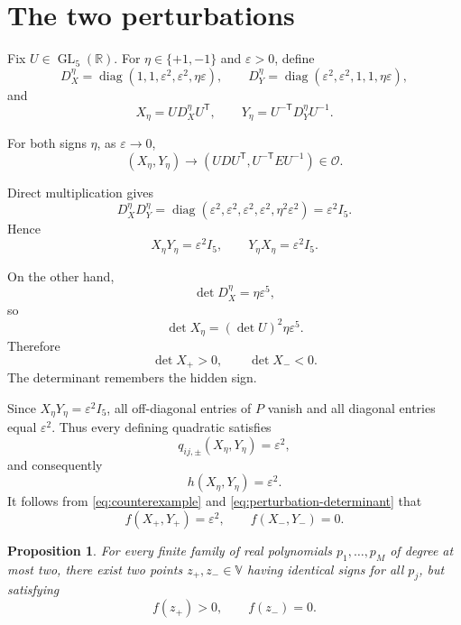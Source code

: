 \documentclass[11pt]{amsart}
\newtheorem{proposition}[theorem]{Proposition}
\theoremstyle{remark}
\DeclareMathOperator{\GL}{GL}
\DeclareMathOperator{\diag}{diag}
\newcommand{\tp}{{\scriptscriptstyle\mathsf{T}}}
\begin{document}
\section{The two perturbations}

Fix $U\in\GL_5(\mathbb R)$. For $\eta\in\{+1,-1\}$ and $\varepsilon>0$, define
\[
D_X^\eta=\diag(1,1,\varepsilon^2,\varepsilon^2,\eta\varepsilon),
\qquad
D_Y^\eta=\diag(\varepsilon^2,\varepsilon^2,1,1,\eta\varepsilon),
\]
and
\begin{equation}
X_\eta=UD_X^\eta U^\tp ,
\qquad
Y_\eta=U^{-\tp} D_Y^\eta U^{-1}.
\label{eq:perturbations}
\end{equation}

For both signs $\eta$, as $\varepsilon \to 0$, 
\[
(X_\eta,Y_\eta)\longrightarrow
(UDU^\tp ,U^{-\tp} EU^{-1})\in\mathcal O.
\]

Direct multiplication gives
\[
D_X^\eta D_Y^\eta
=\diag(\varepsilon^2,\varepsilon^2,\varepsilon^2,\varepsilon^2,\eta^2\varepsilon^2)
=\varepsilon^2I_5.
\]
Hence
\begin{equation}
X_\eta Y_\eta=\varepsilon^2I_5,
\qquad
Y_\eta X_\eta=\varepsilon^2I_5.
\label{eq:perturbation-products}
\end{equation}

On the other hand,
\[
\det D_X^\eta=\eta\varepsilon^5,
\]
so
\begin{equation}
\det X_\eta=(\det U)^2\eta\varepsilon^5.
\label{eq:perturbation-determinant}
\end{equation}
Therefore
\[
\det X_+>0,
\qquad
\det X_-<0.
\]
The determinant remembers the hidden sign.

Since $X_\eta Y_\eta=\varepsilon^2I_5$, all off-diagonal entries of $P$ vanish and all diagonal entries equal $\varepsilon^2$. Thus every defining quadratic satisfies
\[
q_{ij, \pm}(X_\eta,Y_\eta)=\varepsilon^2,
\]
and consequently
\[
h(X_\eta,Y_\eta)=\varepsilon^2.
\]
It follows from \eqref{eq:counterexample} and \eqref{eq:perturbation-determinant} that
\begin{equation}
f(X_+,Y_+)=\varepsilon^2,
\qquad
f(X_-,Y_-)=0.
\label{eq:perturbation-values}
\end{equation}

\begin{proposition}
For every finite family of real polynomials $p_1,\dots,p_M$ of degree at most two, there exist two points $z_+,z_-\in \mathbb{V}$ having identical signs for all $p_j$, but satisfying
\[
f(z_+)>0,
\qquad
f(z_-)=0.
\]
\end{proposition}
\end{document}
